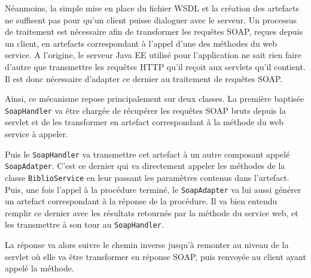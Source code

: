Néanmoins, la simple mise en place du fichier WSDL et la création des artefacts ne suffisent pas pour qu'un client puisse dialoguer avec le serveur. Un processus de traitement est nécessaire afin de transformer les requêtes SOAP, reçues depuis un client, en artefacts correspondant à l'appel d'une des méthodes du web service. A l’origine, le serveur Java EE utilisé pour l’application ne sait rien faire d’autre que transmettre les requêtes HTTP qu’il reçoit aux servlets qu’il contient. Il est donc nécessaire d’adapter ce dernier au traitement de requêtes SOAP.

Ainsi, ce mécanisme repose principalement sur deux classes. La première baptisée \verb|SoapHandler| va être chargée de récupérer les requêtes SOAP bruts depuis la servlet et de les transformer en artefact correspondant à la méthode du web service à appeler.

Puis le \verb|SoapHandler| va transmettre cet artefact à un autre composant appelé \verb|SoapAdatper|. C’est ce dernier qui va directement appeler les méthodes de la classe \verb|BiblioService| en leur passant les paramètres contenus dans l’artefact. Puis, une fois l’appel à la procédure terminé, le \verb|SoapAdapter| va lui aussi générer un artefact correspondant à la réponse de la procédure. Il va bien entendu remplir ce dernier avec les résultats retournés par la méthode du service web, et les transmettre à son tour au \verb|SoapHandler|.

La réponse va alors suivre le chemin inverse jusqu’à remonter au niveau de la servlet où elle va être transformer en réponse SOAP, puis renvoyée au client ayant appelé la méthode.


 


